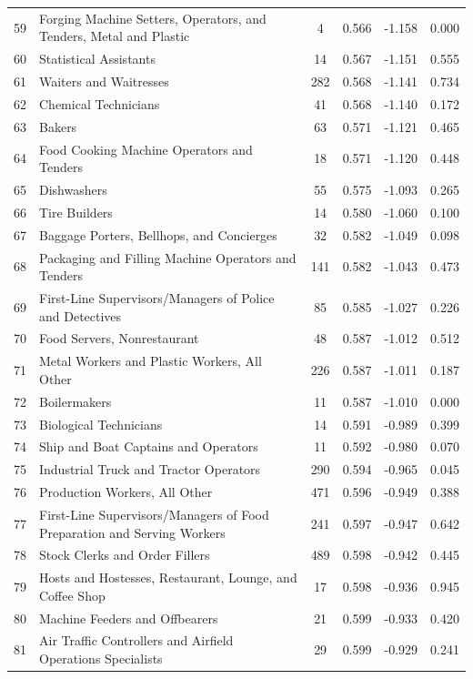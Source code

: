 {\begin{longtable}{llcccc}
 59 & Forging Machine Setters, Operators, and Tenders, Metal and Plastic & 4 & 0.566 & -1.158 & 0.000 \\
 60 & Statistical Assistants & 14 & 0.567 & -1.151 & 0.555 \\
 61 & Waiters and Waitresses & 282 & 0.568 & -1.141 & 0.734 \\
 62 & Chemical Technicians & 41 & 0.568 & -1.140 & 0.172 \\
 63 & Bakers & 63 & 0.571 & -1.121 & 0.465 \\
 64 & Food Cooking Machine Operators and Tenders & 18 & 0.571 & -1.120 & 0.448 \\
 65 & Dishwashers & 55 & 0.575 & -1.093 & 0.265 \\
 66 & Tire Builders & 14 & 0.580 & -1.060 & 0.100 \\
 67 & Baggage Porters, Bellhops, and Concierges & 32 & 0.582 & -1.049 & 0.098 \\
 68 & Packaging and Filling Machine Operators and Tenders & 141 & 0.582 & -1.043 & 0.473 \\
 69 & First-Line Supervisors/Managers of Police and Detectives & 85 & 0.585 & -1.027 & 0.226 \\
 70 & Food Servers, Nonrestaurant & 48 & 0.587 & -1.012 & 0.512 \\
 71 & Metal Workers and Plastic Workers, All Other & 226 & 0.587 & -1.011 & 0.187 \\
 72 & Boilermakers & 11 & 0.587 & -1.010 & 0.000 \\
 73 & Biological Technicians & 14 & 0.591 & -0.989 & 0.399 \\
 74 & Ship and Boat Captains and Operators & 11 & 0.592 & -0.980 & 0.070 \\
 75 & Industrial Truck and Tractor Operators & 290 & 0.594 & -0.965 & 0.045 \\
 76 & Production Workers, All Other & 471 & 0.596 & -0.949 & 0.388 \\
 77 & First-Line Supervisors/Managers of Food Preparation and Serving Workers & 241 & 0.597 & -0.947 & 0.642 \\
 78 & Stock Clerks and Order Fillers & 489 & 0.598 & -0.942 & 0.445 \\
 79 & Hosts and Hostesses, Restaurant, Lounge, and Coffee Shop & 17 & 0.598 & -0.936 & 0.945 \\
 80 & Machine Feeders and Offbearers & 21 & 0.599 & -0.933 & 0.420 \\
 81 & Air Traffic Controllers and Airfield Operations Specialists & 29 & 0.599 & -0.929 & 0.241 \\

\end{longtable}}
